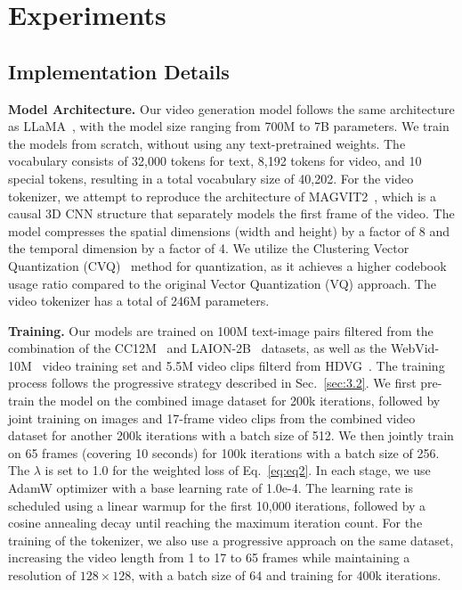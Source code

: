\section{Experiments}
\label{exp}


\subsection{Implementation Details}
\label{sec:4.1}

\textbf{Model Architecture.} Our video generation model follows the same architecture    as LLaMA~\cite{touvron2023llama}, with the model size ranging from 700M to 7B parameters. We train the models from scratch, without using any text-pretrained weights. The vocabulary consists of 32,000 tokens for text, 8,192 tokens for video, and 10 special tokens, resulting in a total vocabulary size of 40,202. 
For the video tokenizer, we attempt to reproduce the architecture of MAGVIT2~\cite{yu2023language}, which is a causal 3D CNN structure that separately models the first frame of the video. The model compresses the spatial dimensions (width and height) by a factor of 8 and the temporal dimension by a factor of 4.  We utilize the Clustering Vector Quantization (CVQ)~\cite{Zheng_2023_CVQ} method for quantization, as it achieves a higher codebook usage ratio compared to the original Vector Quantization (VQ)\cite{esser2020taming, VQ_VAE_paper} approach. The video tokenizer has a total of 246M parameters. 

\textbf{Training.}
Our models are trained on 100M text-image pairs filtered from the combination of the CC12M~\cite{sharma2018conceptual} and LAION-2B~\cite{schuhmann2022laion} datasets, as well as the WebVid-10M~\cite{Bain21} video training set and 5.5M video clips filterd from HDVG~\cite{videofactory}. The training process follows the progressive strategy described in Sec.~\ref{sec:3.2}. We first pre-train the model on the combined image dataset for 200k iterations, followed by joint training on images and 17-frame video clips from the combined video dataset for another 200k iterations with a batch size of 512. We then jointly train on 65 frames (covering 10 seconds) for 100k iterations with a batch size of 256. The $\lambda$ is set to 1.0 for the weighted loss of Eq.~\eqref{eq:eq2}. In each stage, we use AdamW optimizer with a base learning rate of 1.0e-4. The learning rate is scheduled using a linear warmup for the first 10,000 iterations, followed by a cosine annealing decay until reaching the maximum iteration count. For the training of the tokenizer, we also use a progressive approach on the same dataset, increasing the video length from 1 to 17 to 65 frames while maintaining a resolution of $128 \times 128$, with a batch size of 64 and training for 400k iterations.

